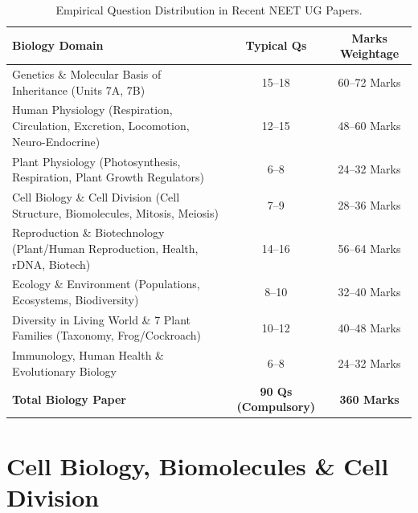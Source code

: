 \documentclass[10pt,twoside,openright]{book}
\begin{document}
\begin{table}[htbp]
\centering
\footnotesize
\setlength{\tabcolsep}{4pt}
\renewcommand{\arraystretch}{1.2}
\begin{tabularx}{\textwidth}{L c c}
\toprule
\textbf{Biology Domain} & \textbf{Typical Qs} & \textbf{Marks Weightage} \\
\midrule
Genetics \& Molecular Basis of Inheritance (Units 7A, 7B) & 15--18 & 60--72 Marks \\
Human Physiology (Respiration, Circulation, Excretion, Locomotion, Neuro-Endocrine) & 12--15 & 48--60 Marks \\
Plant Physiology (Photosynthesis, Respiration, Plant Growth Regulators) & 6--8 & 24--32 Marks \\
Cell Biology \& Cell Division (Cell Structure, Biomolecules, Mitosis, Meiosis) & 7--9 & 28--36 Marks \\
Reproduction \& Biotechnology (Plant/Human Reproduction, Health, rDNA, Biotech) & 14--16 & 56--64 Marks \\
Ecology \& Environment (Populations, Ecosystems, Biodiversity) & 8--10 & 32--40 Marks \\
Diversity in Living World \& 7 Plant Families (Taxonomy, Frog/Cockroach) & 10--12 & 40--48 Marks \\
Immunology, Human Health \& Evolutionary Biology & 6--8 & 24--32 Marks \\
\midrule
\textbf{Total Biology Paper} & \textbf{90 Qs (Compulsory)} & \textbf{360 Marks} \\
\bottomrule
\end{tabularx}
\caption{Empirical Question Distribution in Recent NEET UG Papers.}
\end{table}

\cleardoublepage

\setcounter{tocdepth}{2}
\setcounter{secnumdepth}{2}
\tableofcontents
\cleardoublepage

\mainmatter


\part{Cell Biology, Biomolecules \& Cell Division}
\end{document}
